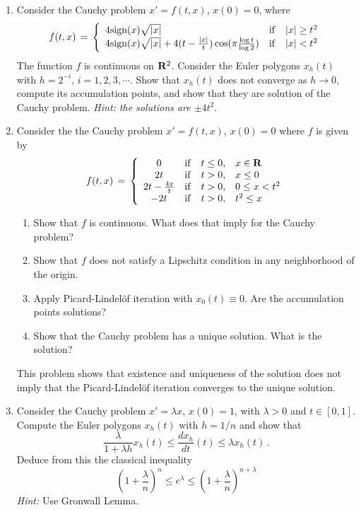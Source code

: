 \documentclass[12pt]{report}
\newcommand{\bR}{{\bf R}}
\def\to{\rightarrow}
\begin{document}
\begin{enumerate}
\item Consider the Cauchy problem $x' = f(t,x)$, $x(0)=0$, where
\begin{equation}
f(t,x) \,=\,\left\{ \begin{array}{lcc} 
4 {\rm sign}(x) \sqrt{|x|}   & {\rm if} & |x| \ge t^2 \\
4 {\rm sign}(x) \sqrt{|x|} + 4(t - \frac{|x|}{t}) \cos(\pi \frac{\log t}
{\log 2})  & {\rm if} & |x| < t^2 
\end{array}\right. 
\end{equation}
The function $f$ is continuous on ${\bR^2}$. Consider the Euler polygons 
$x_h(t)$ with $h = 2^{-i}$, $i =1,2,3, \cdots$. Show that $x_h(t)$ does not 
converge as $h \to 0$, compute its accumulation points, and show that they are 
solution of the Cauchy problem. {\em Hint: the solutions are $\pm 4 t^2$}. 


\item Consider the the Cauchy problem $x'=f(t,x)$, $x(0)=0$ where 
$f$ is given by 
\begin{equation}
f(t,x) \,=\,\left\{ \begin{array}{cccl}
0                 & {\rm if} & t \le 0,& x \in \bR \\ 
2t                & {\rm if} & t > 0,  & x \le  0 \\ 
2t - \frac{4x}{t} & {\rm if} & t > 0,  & 0 \le  x < t^2  \\ 
-2t               & {\rm if} & t > 0,  & t^2 \le x 
\end{array} \right. 
\end{equation}
\begin{enumerate}
\item Show that $f$ is continuous. What does that imply for the Cauchy problem?
\item Show that $f$ does not satisfy a Lipschitz condition in any
neighborhood of the origin.
\item Apply Picard-Lindel\"of iteration with $x_0(t) \equiv 0$. Are
the accumulation points solutions?
\item Show that the Cauchy problem has a unique solution. What is the
solution?
\end{enumerate}
This problem shows that existence and uniqueness of the
solution does not imply that the Picard-Lindel\"of iteration converges
to the unique solution. 


\item Consider the Cauchy problem $x'=\lambda x$, $x(0)=1$, with $\lambda > 0$ and $t \in [0,1]$. Compute the Euler polygons $x_h(t)$ with $h=1/n$ and show that 
\begin{equation}
\frac{\lambda}{ 1 + \lambda h} 
x_h(t) \le  \frac{d x_h}{dt} (t) \le \lambda x_h(t) \,.
\end{equation}
Deduce from this the classical inequality 
\begin{equation}
\left( 1 +\frac{\lambda}{n}\right)^n \le e^\lambda \le  
\left( 1 +\frac{\lambda}{n}\right)^{n+\lambda}
\end{equation}
{\em Hint:} Use Gronwall Lemma.



\end{enumerate}
\end{document}
